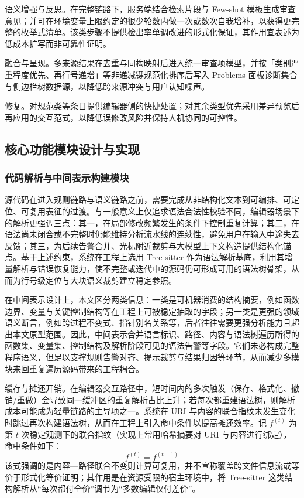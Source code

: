 语义增强与反思。在完整链路下，服务端结合检索片段与 Few-shot 模板生成审查意见；并可在环境变量上限约定的很少轮数内做一次或数次自我增补，以获得更完整的枚举式清单\cite{hou2024llmse,lu2023llamareviewer,collante2025impact,lewis2020retrieval}。该类步骤不提供检出率单调改进的形式化保证，其作用宜表述为低成本扩写而非可靠性证明。

融合与呈现。多来源结果在去重与同构映射后进入统一审查项模型，并按「类别严重程度优先、再行号递增」等非递减键规范化排序后写入 Problems 面板诊断集合与侧边栏树数据源，以降低跨来源冲突与用户认知噪声\cite{microsoft2025vscodeapi}。

修复。对规范类等条目提供编辑器侧的快捷处置；对其余类型优先采用差异预览后再应用的交互范式，以降低误修改风险并保持人机协同的可控性\cite{microsoft2025vscodeapi}。

\subsection{核心功能模块设计与实现}

\subsubsection{代码解析与中间表示构建模块}

源代码在进入规则链路与语义链路之前，需要完成从非结构化文本到可编排、可定位、可复用表征的过渡。与一般意义上仅追求语法合法性校验不同，编辑器场景下的解析更强调三点：其一，在局部修改频繁发生的条件下控制重复计算；其二，在语法尚未闭合或不完整时仍能维持分析流水线的连续性，避免用户在输入中途失去反馈；其三，为后续告警合并、光标附近裁剪与大模型上下文构造提供结构化锚点。基于上述约束，系统在工程上选用 Tree-sitter 作为语法解析基底，利用其增量解析与错误恢复能力，使不完整或迭代中的源码仍可形成可用的语法树骨架，从而为行号级定位与大块语义裁剪建立稳定参照。

在中间表示设计上，本文区分两类信息：一类是可机器消费的结构摘要，例如函数边界、变量与关键控制结构等在工程上可被稳定抽取的字段；另一类是更强的领域语义断言，例如跨过程不变式、指针别名关系等，后者往往需要更强分析能力且超出本文原型范围。因此，中间表示合并语言标识、路径、内容与语法树遍历所得的函数集、变量集、控制结构及解析阶段可见的语法告警等字段。它们未必构成完整程序语义，但足以支撑规则告警对齐、提示裁剪与结果归因等环节，从而减少多模块来回重复遍历源码带来的工程耦合。

缓存与摊还开销。在编辑器交互路径中，短时间内的多次触发（保存、格式化、撤销/重做）会导致同一缓冲区的重复解析占比上升；若每次都重建语法树，则解析成本可能成为轻量链路的主导项之一。系统在 URI 与内容的联合指纹未发生变化时跳过再次构建语法树，从而在工程上引入命中条件以提高摊还效率。记 $f^{(t)}$ 为第 $t$ 次稳定观测下的联合指纹（实现上常用哈希摘要对 URI 与内容进行绑定），命中条件如下：
\begin{equation}
f^{(t)}=f^{(t-1)}
\label{eq:parse-hash-hit}
\end{equation}
该式强调的是内容—路径联合不变则计算可复用，并不宣称覆盖跨文件信息流或等价于形式化等价证明；其作用是在资源受限的宿主环境中，将 Tree-sitter 这类结构解析从“每次都付全价”调节为“多数编辑仅付差价”。

